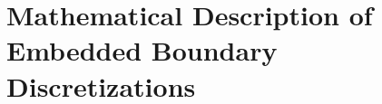 \documentclass[12pt]{article}
\newcommand{\mcl}[1]{{\mathcal{#1}}}
\newcommand{\ind}{{\rm{ind}}}
\newcommand{\low}{{\rm{low}}}
\newcommand{\high}{{\rm{high}}}
\newcommand{\face}{{\mbf{f}}}
\begin{document}

\section{Mathematical Description of Embedded Boundary Discretizations}
\end{document}
